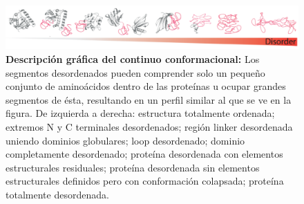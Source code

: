 \begin{figure}[htbp]
\centering
\includegraphics[width=1.0\textwidth]{img/conformationContinuum.png} 
\caption{ \textbf{Descripción gráfica del continuo conformacional:} Los segmentos desordenados pueden comprender solo un pequeño conjunto de aminoácidos dentro de las proteínas u ocupar grandes segmentos de ésta, resultando en un
perfil similar al que se ve en la figura. De izquierda a derecha: estructura totalmente ordenada; extremos N y C terminales desordenados; región linker desordenada uniendo dominios globulares; loop desordenado;
dominio completamente desordenado; proteína desordenada con elementos estructurales residuales; proteína desordenada sin elementos estructurales definidos pero con conformación colapsada; proteína totalmente desordenada.
}
\label{conformationContinuum}
\end{figure}






